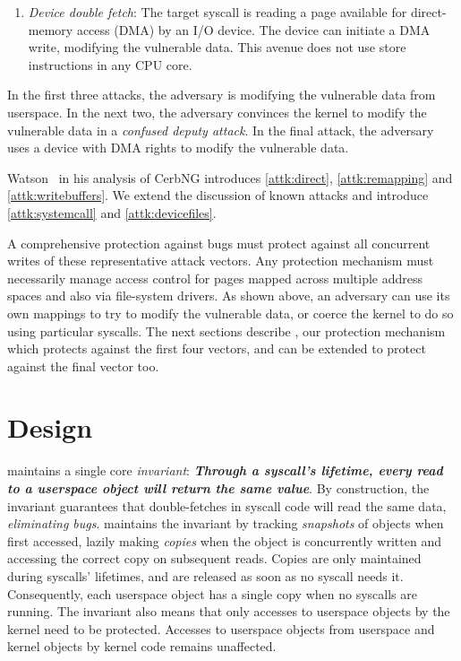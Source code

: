 \documentclass[letterpaper,twocolumn,10pt, anonymous]{article}
\begin{document}
\begin{enumerate}
  \item \label{attk:devicefiles} \emph{Device double fetch}: The target 
  syscall is reading a page available for direct-memory access (DMA) by 
  an I/O device. The device can initiate a DMA write, modifying the 
  vulnerable data. This avenue does not use store instructions in any 
  CPU core.

\end{enumerate}

In the first three attacks, the adversary is modifying the vulnerable data 
from userspace.
In the next two, the adversary convinces the kernel to modify the vulnerable
data in a \emph{confused deputy attack}.
In the final attack, the adversary uses a device with DMA rights to modify 
the vulnerable data.

Watson~\cite{watson2007exploiting} in his analysis of CerbNG introduces
\autoref{attk:direct}, \autoref{attk:remapping} and \autoref{attk:writebuffers}.
We extend the discussion of known attacks and introduce
\autoref{attk:systemcall} and \autoref{attk:devicefiles}.

A comprehensive protection against \tocttou bugs must protect against 
all concurrent writes of these representative attack vectors.
Any protection mechanism must necessarily manage access control for pages
mapped across multiple address spaces and also via file-system drivers.
As shown above, an adversary can use its own mappings to try to modify the
vulnerable data, or coerce the kernel to do so using particular syscalls.
The next sections describe \tiktok, our protection mechanism which 
protects against the first four vectors, and can be extended to protect 
against the final vector too.


\section{\tiktok Design} 
\label{sec:design}

\tiktok maintains a single core \emph{invariant}:
\textbf{\emph{Through a syscall's lifetime, every read to a userspace object 
will return the same value}}.
By construction, the invariant guarantees that double-fetches in syscall
code will read the same data, \emph{eliminating \tocttou bugs}.
\tiktok maintains the invariant by tracking \emph{snapshots} of objects
when first accessed, lazily making \emph{copies} when the object is concurrently 
written and accessing the correct copy on subsequent reads.
Copies are only maintained during syscalls' lifetimes, and are released as 
soon as no syscall needs it.
Consequently, each userspace object has a single copy when no syscalls are
running.
The invariant also means that only accesses to userspace objects by the kernel
need to be protected. 
Accesses to userspace objects from userspace and kernel objects by kernel 
code remains unaffected.
\end{document}
